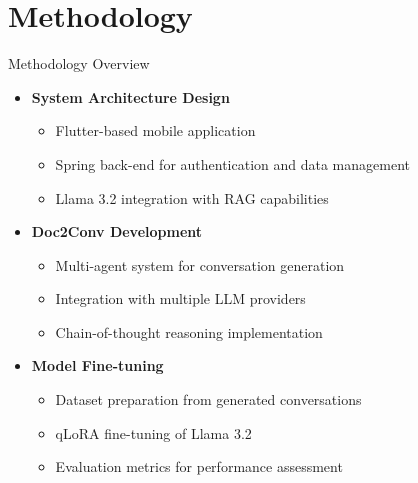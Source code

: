 \section{Methodology}
\begin{frame}{Methodology Overview}
  \begin{itemize}
    \item \textbf{System Architecture Design}
      \begin{itemize}
        \item Flutter-based mobile application
        \item Spring back-end for authentication and data management
        \item Llama 3.2 integration with RAG capabilities
      \end{itemize}
    \item \textbf{Doc2Conv Development}
      \begin{itemize}
        \item Multi-agent system for conversation generation
        \item Integration with multiple LLM providers
        \item Chain-of-thought reasoning implementation
      \end{itemize}
    \item \textbf{Model Fine-tuning}
      \begin{itemize}
        \item Dataset preparation from generated conversations
        \item qLoRA fine-tuning of Llama 3.2
        \item Evaluation metrics for performance assessment
      \end{itemize}
  \end{itemize}
\end{frame}

